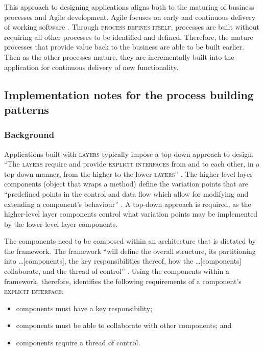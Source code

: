 \documentclass[prodmode]{style/acmlarge}
\begin{document}
This approach to designing applications aligns both to the maturing of business
processes and Agile development.  Agile focuses on early and continuous delivery
of working software \cite{agile-manifesto}.  Through \textsc{process defines
itself}, processes are built without requiring all other processes to be
identified and defined.  Therefore, the mature processes that provide value back
to the business are able to be built earlier.  Then as the other processes
mature, they are incrementally built into the application for continuous
delivery of new functionality.


\subsection{\textbf{Implementation notes for the process building patterns}}

\subsubsection*{Background}

Applications built with \textsc{layers} typically impose a top-down approach to
design.  ``The \textsc{layers} require and provide \textsc{explicit interfaces}
from and to each other, in a top-down manner, from the higher to the lower
\textsc{layers}'' \cite[p. 11]{ioc}.  The higher-level layer components (object
that wraps a method) define the variation points that are ``predefined points in
the control and data flow which allow for modifying and extending a component's
behaviour'' \cite[p. 5]{ioc}.  A top-down approach is required, as the
higher-level layer components control what variation points may be implemented
by the lower-level layer components.

The components need to be composed within an architecture that is dictated by
the framework.  The framework ``will define the overall structure, its
partitioning into \ldots [components], the key responsibilities thereof, how the
\ldots [components] collaborate, and the thread of control'' \cite[p. 26]{gof}.
Using the components within a framework, therefore, identifies the following
requirements of a component's \textsc{explicit interface}:
\begin{itemize}
  \item components must have a key responsibility;
  \item components must be able to collaborate with other components; and
  \item components require a thread of control.
\end{itemize}
\end{document}
